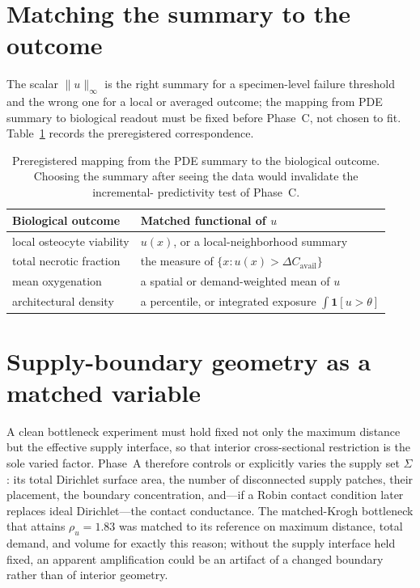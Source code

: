 \documentclass[11pt]{article}
\theoremstyle{remark}
\newcommand{\Sig}{\Sigma}
\newcommand{\rhou}{\rho_u}
\newcommand{\norminf}[1]{\lVert#1\rVert_{\infty}}
\begin{document}
\section{Matching the summary to the outcome}\label{sec:outcome}

The scalar $\norminf{u}$ is the right summary for a specimen-level failure
threshold and the wrong one for a local or averaged outcome; the mapping from PDE
summary to biological readout must be fixed before Phase~C, not chosen to fit.
Table~\ref{tab:outcome} records the preregistered correspondence.

\begin{table}[t]
\centering
\begin{tabular}{@{}p{}p{}@{}}
\toprule
\textbf{Biological outcome} & \textbf{Matched functional of $u$}\\
\midrule
local osteocyte viability & $u(x)$, or a local-neighborhood summary\\
total necrotic fraction & the measure of $\{x:u(x)>\Delta C_{\text{avail}}\}$\\
mean oxygenation & a spatial or demand-weighted mean of $u$\\
architectural density & a percentile, or integrated exposure
$\int\mathbf{1}[u>\theta]$\\
\bottomrule
\end{tabular}
\caption{Preregistered mapping from the PDE summary to the biological outcome.
Choosing the summary after seeing the data would invalidate the incremental-
predictivity test of Phase~C.}
\label{tab:outcome}
\end{table}

\section{Supply-boundary geometry as a matched variable}\label{sec:supply}

A clean bottleneck experiment must hold fixed not only the maximum distance but
the effective supply interface, so that interior cross-sectional restriction is
the sole varied factor. Phase~A therefore controls or explicitly varies the
supply set $\Sig$: its total Dirichlet surface area, the number of disconnected
supply patches, their placement, the boundary concentration, and---if a Robin
contact condition later replaces ideal Dirichlet---the contact conductance. The
matched-Krogh bottleneck that attains $\rhou=1.83$ was matched to its reference on
maximum distance, total demand, and volume for exactly this reason; without the
supply interface held fixed, an apparent amplification could be an artifact of a
changed boundary rather than of interior geometry.
\end{document}

